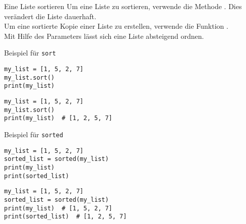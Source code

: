 \begin{fragile}



	
\begin{block}{Eine Liste sortieren}
\vspace{2pt}
Um eine Liste zu sortieren, verwende die Methode . Dies verändert die Liste dauerhaft. \\
\pause 
Um eine sortierte Kopie einer Liste zu erstellen, verwende die Funktion .  \\
\pause 
Mit Hilfe des Parameters  lässt sich eine Liste absteigend ordnen. 
\end{block}	

\pause \vspace{12pt}

\begin{exampleblock}{Beispiel für \texttt{sort}}
\vspace{2pt}
\begin{overprint}
\begin{verbatim}
my_list = [1, 5, 2, 7]
my_list.sort()
print(my_list)  
\end{verbatim}
\begin{verbatim}
my_list = [1, 5, 2, 7]
my_list.sort()
print(my_list)  # [1, 2, 5, 7]
\end{verbatim}
\end{overprint}

\end{exampleblock}

\vspace{12pt}

\pause \pause 

\begin{exampleblock}{Beispiel für \texttt{sorted}}
\vspace{2pt}
\begin{overprint}
\begin{verbatim}
my_list = [1, 5, 2, 7]
sorted_list = sorted(my_list)
print(my_list)  
print(sorted_list)  
\end{verbatim}
\begin{verbatim}
my_list = [1, 5, 2, 7]
sorted_list = sorted(my_list)
print(my_list)  # [1, 5, 2, 7]
print(sorted_list)  # [1, 2, 5, 7]
\end{verbatim}
\end{overprint}
\end{exampleblock}
\end{fragile}

